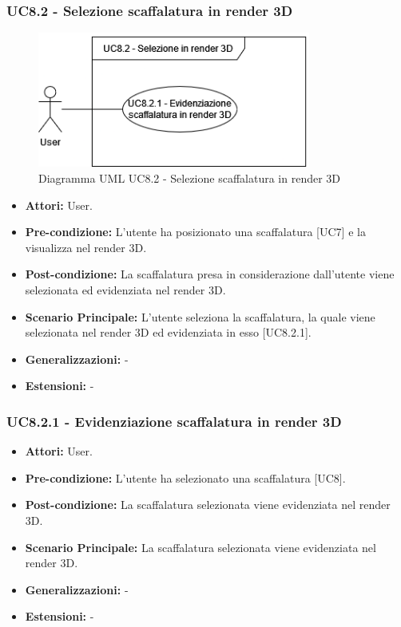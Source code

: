 \subsubsection{UC8.2 - Selezione scaffalatura in render 3D}
\begin{figure}[H]
  \centering
  \includegraphics[width=0.8\textwidth]{UC_diagrams_1-10/UC8.2.drawio.png}
   \caption{Diagramma UML UC8.2 - Selezione scaffalatura in render 3D}
\end{figure}
\begin{itemize}
    \item \textbf{Attori:} User.
    \item \textbf{Pre-condizione:} L'utente ha posizionato una scaffalatura [UC7] e la visualizza nel render 3D.
    \item \textbf{Post-condizione:} La scaffalatura presa in considerazione dall'utente viene selezionata ed evidenziata nel render 3D.
    \item \textbf{Scenario Principale:} L'utente seleziona la scaffalatura, la quale viene selezionata nel render 3D ed evidenziata in esso [UC8.2.1].
    \item \textbf{Generalizzazioni:} -
    \item \textbf{Estensioni:} -
\end{itemize}


\subsubsection{UC8.2.1 - Evidenziazione scaffalatura in render 3D}
\begin{itemize}
    \item \textbf{Attori:} User.
    \item \textbf{Pre-condizione:} L'utente ha selezionato una scaffalatura [UC8].
    \item \textbf{Post-condizione:} La scaffalatura selezionata viene evidenziata nel render 3D.
    \item \textbf{Scenario Principale:} La scaffalatura selezionata viene evidenziata nel render 3D.
    \item \textbf{Generalizzazioni:} -
    \item \textbf{Estensioni:} -
\end{itemize}